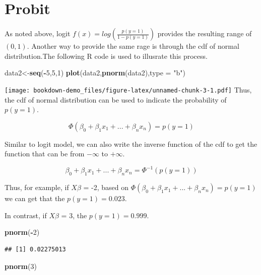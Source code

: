 \documentclass[
]{book}
\newenvironment{Shaded}{\begin{snugshade}}{\end{snugshade}}
\newcommand{\DataTypeTok}[1]{\textcolor[rgb]{0.13,0.29,0.53}{#1}}
\newcommand{\DecValTok}[1]{\textcolor[rgb]{0.00,0.00,0.81}{#1}}
\newcommand{\KeywordTok}[1]{\textcolor[rgb]{0.13,0.29,0.53}{\textbf{#1}}}
\newcommand{\NormalTok}[1]{#1}
\newcommand{\OperatorTok}[1]{\textcolor[rgb]{0.81,0.36,0.00}{\textbf{#1}}}
\newcommand{\StringTok}[1]{\textcolor[rgb]{0.31,0.60,0.02}{#1}}
\begin{document}
\hypertarget{probit}{%
\section{Probit}\label{probit}}

As noted above, logit \(f(x)=log(\frac{p(y=1)}{1-p(y=1)})\) provides the resulting range of \((0,1)\). Another way to provide the same rage is through the cdf of normal distribution.The following R code is used to illusrate this process.

\begin{Shaded}
\begin{Highlighting}[]
\NormalTok{data2<-}\KeywordTok{seq}\NormalTok{(}\OperatorTok{-}\DecValTok{5}\NormalTok{,}\DecValTok{5}\NormalTok{,}\DecValTok{1}\NormalTok{)}
\KeywordTok{plot}\NormalTok{(data2,}\KeywordTok{pnorm}\NormalTok{(data2),}\DataTypeTok{type =} \StringTok{"b"}\NormalTok{)}
\end{Highlighting}
\end{Shaded}

\texttt{[image: bookdown-demo\_files/figure-latex/unnamed-chunk-3-1.pdf]}
Thus, the cdf of normal distribution can be used to indicate the probability of \(p(y=1)\).

\[\Phi(\beta_0+\beta_1x_1+...+\beta_nx_n )= p(y=1)\]

Similar to logit model, we can also write the inverse function of the cdf to get the function that can be from \(-\infty\) to \(+\infty\).

\[\beta_0+\beta_1x_1+...+\beta_nx_n =\Phi^{-1}(p(y=1))\]

Thus, for example, if \(X\beta\) = -2, based on \(\Phi(\beta_0+\beta_1x_1+...+\beta_nx_n )= p(y=1)\) we can get that the \(p(y=1)=0.023\).

In contrast, if \(X\beta\) = 3, the \(p(y=1)=0.999\).

\begin{Shaded}
\begin{Highlighting}[]
\KeywordTok{pnorm}\NormalTok{(}\OperatorTok{-}\DecValTok{2}\NormalTok{)}
\end{Highlighting}
\end{Shaded}

\begin{verbatim}
## [1] 0.02275013
\end{verbatim}

\begin{Shaded}
\begin{Highlighting}[]
\KeywordTok{pnorm}\NormalTok{(}\DecValTok{3}\NormalTok{)}
\end{Highlighting}
\end{Shaded}
\end{document}
